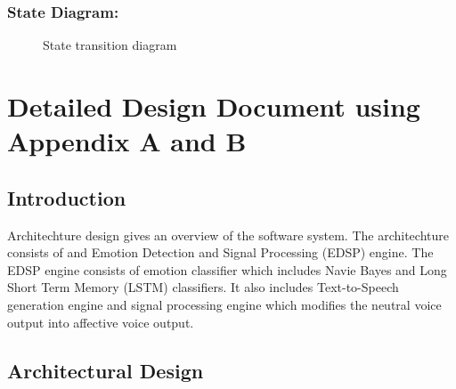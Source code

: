\documentclass[oneside,a4paper,12pt]{book}
\begin{document}
\newpage
\subsection{State Diagram:}	
\begin{center}
	\begin{figure}[!htbp]
		\centering
		\caption{State transition diagram}
		\label{fig:state-dig}
	\end{figure}
\end{center} 



\chapter{Detailed Design Document using Appendix A and B}
 \section{Introduction}  
 Architechture design gives an overview of the software system. The architechture consists of and Emotion Detection and Signal Processing (EDSP) engine. The EDSP engine consists of emotion classifier which includes Navie Bayes and Long Short Term Memory (LSTM) classifiers. It also includes Text-to-Speech generation engine and signal processing engine which modifies the neutral voice output into affective voice output.
\section{Architectural Design}  
\end{document}
